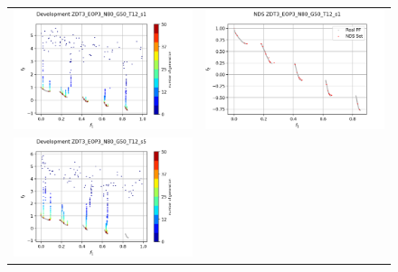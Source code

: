 \begin{figure}[H]
    \centering
    \begin{tabular}{c c}
    \includegraphics[scale=0.5]{figures/ZDT3_EOP3_N80_G50_T12/s1_dev.png} &
    \includegraphics[scale=0.5]{figures/ZDT3_EOP3_N80_G50_T12/s1_nds.png}\\
    \includegraphics[scale=0.5]{figures/ZDT3_EOP3_N80_G50_T12/s5_dev.png} &

\end{tabular}
\end{figure}
